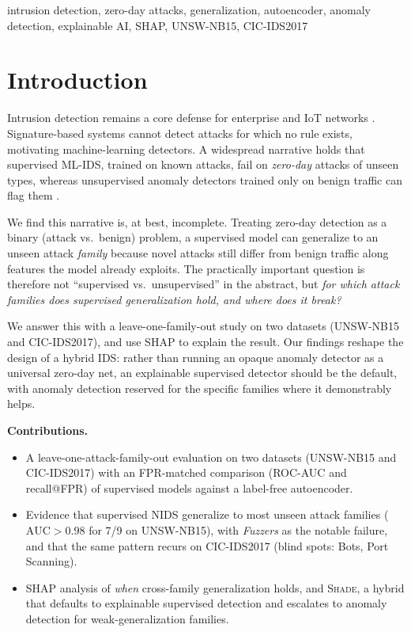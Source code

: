 \documentclass[conference]{IEEEtran}
\begin{document}
\begin{IEEEkeywords}
intrusion detection, zero-day attacks, generalization, autoencoder, anomaly
detection, explainable AI, SHAP, UNSW-NB15, CIC-IDS2017
\end{IEEEkeywords}

\section{Introduction}
Intrusion detection remains a core defense for enterprise and IoT networks
\cite{xai_survey}. Signature-based systems cannot detect attacks for which no rule
exists, motivating machine-learning detectors. A widespread narrative holds that
supervised ML-IDS, trained on known attacks, fail on \emph{zero-day} attacks of
unseen types, whereas unsupervised anomaly detectors trained only on benign
traffic can flag them \cite{dae_zeroday,ae_review}.

We find this narrative is, at best, incomplete. Treating zero-day detection as a
binary (attack vs.\ benign) problem, a supervised model can generalize to an unseen
attack \emph{family} because novel attacks still differ from benign traffic along
features the model already exploits. The practically important question is therefore
not ``supervised vs.\ unsupervised'' in the abstract, but \emph{for which attack
families does supervised generalization hold, and where does it break?}

We answer this with a leave-one-family-out study on two datasets (UNSW-NB15 and
CIC-IDS2017), and use SHAP to explain the result. Our findings reshape the design of
a hybrid IDS: rather than
running an opaque anomaly detector as a universal zero-day net, an explainable
supervised detector should be the default, with anomaly detection reserved for the
specific families where it demonstrably helps.

\noindent\textbf{Contributions.}
\begin{itemize}
  \item A leave-one-attack-family-out evaluation on two datasets (UNSW-NB15 and
        CIC-IDS2017) with an FPR-matched comparison (ROC-AUC and recall@FPR) of
        supervised models against a label-free autoencoder.
  \item Evidence that supervised NIDS generalize to most unseen attack families
        ($\mathrm{AUC}>0.98$ for 7/9 on UNSW-NB15), with \emph{Fuzzers} as the
        notable failure, and that the same pattern recurs on CIC-IDS2017
        (blind spots: Bots, Port Scanning).
  \item SHAP analysis of \emph{when} cross-family generalization holds, and
        \textsc{Shade}, a hybrid that defaults to explainable supervised detection
        and escalates to anomaly detection for weak-generalization families.
\end{itemize}
\end{document}

